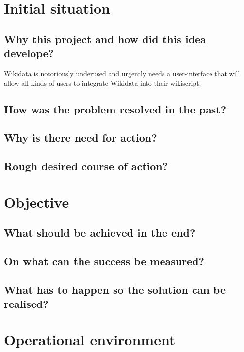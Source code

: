 \documentclass{article}
\date{10.11.2015}
\begin{document}
\section{Initial situation}

\subsection{Why this project and how did this idea develope?}

Wikidata is notoriously underused and urgently needs a user-interface that will allow all kinds of users to integrate Wikidata into their wikiscript. 

\subsection{How was the problem resolved in the past?}

\subsection{Why is there need for action?}

\subsection{Rough desired course of action?}


\section{Objective}

\subsection{What should be achieved in the end?}

\subsection{On what can the success be measured?}

\subsection{What has to happen so the solution can be realised?}


\section{Operational environment}
\end{document}

